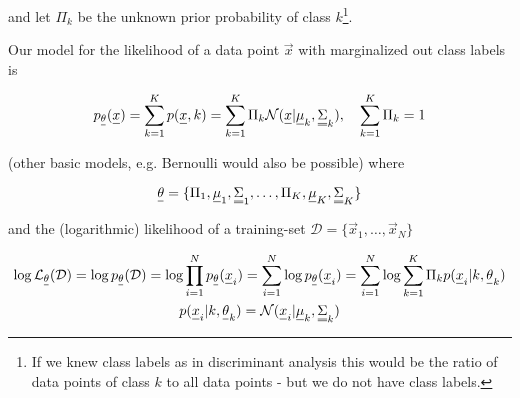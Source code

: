 and let $\Pi_k$ be the unknown prior probability of class $k$\footnote{If we knew class
labels as in discriminant analysis this would be the ratio of data points of class $k$
to all data points - but we do not have class labels.}.

Our model for the likelihood of a data point $\vec{x}$ with marginalized out class labels is

\begin{equation}
    p_\vec{\theta}(\vec{x}) = \sum_{k=1}^{K} p(\vec{x}, k) = \sum_{k=1}^{K} \Pi_k \mathcal{N}(\vec{x} | \vec{\mu}_k, \mat{\Sigma}_k), \quad \sum_{k=1}^{K} \Pi_k = 1
\end{equation}

(other basic models, e.g. Bernoulli would also be possible) where

\begin{equation}
    \vec{\theta} = \{ \Pi_1, \vec{\mu}_1, \mat{\Sigma}_1, \dots, \Pi_K, \vec{\mu}_K, \mat{\Sigma}_K \}
\end{equation}

and the (logarithmic) likelihood of a training-set $\mathcal{D} = \{ \vec{x}_1, \dots, \vec{x}_N \}$

\begin{equation}
    \begin{gathered}
        \log \mathcal{L}_{\vec{\theta}}(\mathcal{D}) = \log p_{\vec{\theta}}(\mathcal{D}) = \log \prod_{i=1}^{N} p_\vec{\theta}(\vec{x}_i) = \sum_{i=1}^{N} \log p_\vec{\theta}(\vec{x}_i) = \sum_{i=1}^{N} \log \sum_{k=1}^{K} \Pi_k p(\vec{x}_i | k, \vec{\theta}_k) \\
        p(\vec{x}_i | k, \vec{\theta}_k) = \mathcal{N}(\vec{x}_i | \vec{\mu}_k, \mat{\Sigma}_k)
    \end{gathered}
\end{equation}



